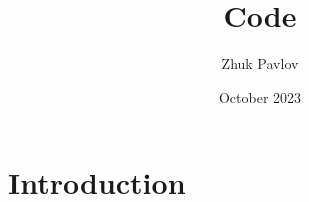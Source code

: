 \documentclass{article}
\title{Code}
\author{Zhuk Pavlov}
\date{October 2023}
\begin{document}
\maketitle

\section{Introduction}
\end{document}
